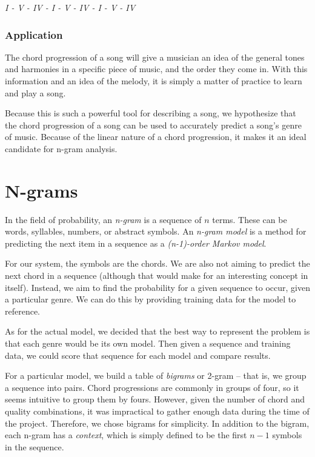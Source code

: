 ﻿\documentclass{article}
\begin{document}
		\begin{center}
		\emph{I - V - IV - I - V - IV - I - V - IV}
		\end{center}

		\subsubsection{Application}
		The chord progression of a song will give a musician an idea of the general 
		tones and harmonies in a specific piece of music, and the order they 
		come in.  With this information and an idea of the melody, it is simply 
		a matter of practice to learn and play a song.

		Because this is such a powerful tool for describing a song, we hypothesize 
		that the chord progression of a song can be used to accurately predict a 
		song's genre of music.  Because of the linear nature of a chord progression, 
		it makes it an ideal candidate for n-gram analysis.
  
\newpage

\section{N-grams}

In the field of probability, an \emph{n-gram} is a sequence of $n$ terms. These can be
words, syllables, numbers, or abstract symbols. An \emph{n-gram model} is a method
for predicting the next item in a sequence as a \emph{(n-1)-order Markov model}. 

For our system, the symbols are the chords. We are also not aiming to predict the
next chord in a sequence (although that would make for an interesting concept in
itself). Instead, we aim to find the probability for a given sequence to occur, given
a particular genre. We can do this by providing training data for the model to reference.

As for the actual model, we decided that the best way to represent the problem is
that each genre would be its own model. Then given a sequence and training data,
we could score that sequence for each model and compare results. 

For a particular model, we build a table of \emph{bigrams} or 2-gram -- that is, we group
a sequence into pairs. Chord progressions are commonly in groups of four, so it 
seems intuitive to group them by fours. However,
given the number of chord and quality combinations, it was impractical to gather
enough data during the time of the project. Therefore, we chose bigrams for
simplicity. In addition to the bigram, each n-gram has a \emph{context}, which
is simply defined to be the first $n-1$ symbols in the sequence.
\end{document}
